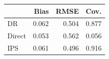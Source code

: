\begin{tabular}{l*{3}{r}} 
\toprule 
 &  Bias &  RMSE &  Cov. \\ 
 \midrule
DR & 0.062 & 0.504 & 0.877 \\
Direct & 0.053 & 0.562 & 0.056 \\
IPS & 0.061 & 0.496 & 0.916 \\ 
\bottomrule 
\end{tabular}